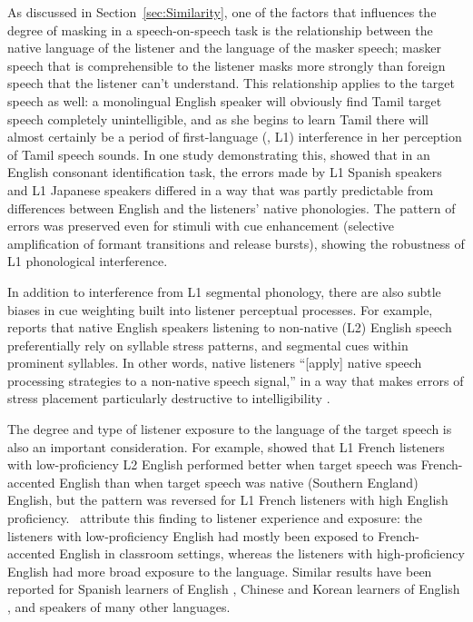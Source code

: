 As discussed in Section~\ref{sec:Similarity}, one of the factors that influences the degree of masking in a speech-on-speech task is the relationship between the native language of the listener and the language of the masker speech; masker speech that is comprehensible to the listener masks more strongly than foreign speech that the listener can’t understand.  This relationship applies to the target speech as well: a monolingual English speaker will obviously find Tamil target speech completely unintelligible, and as she begins to learn Tamil there will almost certainly be a period of first-language (\aka, L1) interference in her perception of Tamil speech sounds.  In one study demonstrating this, \citet{HazanSimpson2000} showed that in an English consonant identification task, the errors made by L1 Spanish speakers and L1 Japanese speakers differed in a way that was partly predictable from differences between English and the listeners’ native phonologies.  The pattern of errors was preserved even for stimuli with cue enhancement (selective amplification of formant transitions and release bursts), showing the robustness of L1 phonological interference.

In addition to interference from L1 segmental phonology, there are also subtle biases in cue weighting built into listener perceptual processes.  For example, \citeauthor{Zielinski2008} reports that native English speakers listening to non-native (L2) English speech preferentially rely on syllable stress patterns, and segmental cues within prominent syllables.  In other words, native listeners “[apply] native speech processing strategies to a non-native speech signal,” in a way that makes errors of stress placement particularly destructive to intelligibility \citep[80]{Zielinski2008}.

The degree and type of listener exposure to the language of the target speech is also an important consideration.  For example, \citet{PinetEtAl2011} showed that L1 French listeners with low-proficiency L2 English performed better when target speech was French-accented English than when target speech was native (Southern England) English, but the pattern was reversed for L1 French listeners with high English proficiency.  \citeauthor{PinetEtAl2011}\ attribute this finding to listener experience and exposure: the listeners with low-proficiency English had mostly been exposed to French-accented English in classroom settings, whereas the listeners with high-proficiency English had more broad exposure to the language.  Similar results have been reported for Spanish learners of English \citep{ImaiEtAl2005}, Chinese and Korean learners of English \citep{BentBradlow2003}, and speakers of many other languages.%

